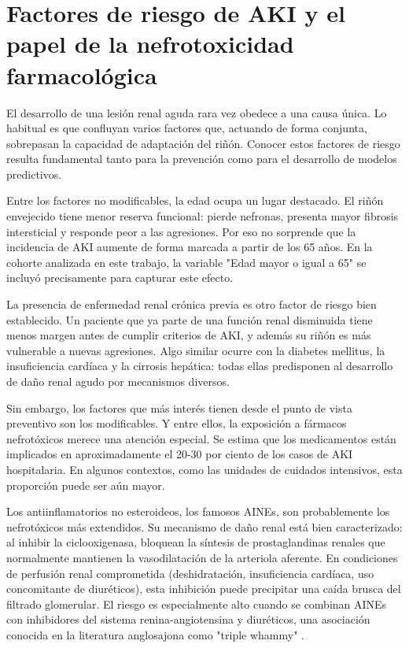 \documentclass[12pt, a4paper, oneside]{report}
\begin{document}
\section{Factores de riesgo de AKI y el papel de la nefrotoxicidad farmacológica}

El desarrollo de una lesión renal aguda rara vez obedece a una causa única. Lo habitual es que confluyan varios factores que, actuando de forma conjunta, sobrepasan la capacidad de adaptación del riñón. Conocer estos factores de riesgo resulta fundamental tanto para la prevención como para el desarrollo de modelos predictivos.

Entre los factores no modificables, la edad ocupa un lugar destacado. El riñón envejecido tiene menor reserva funcional: pierde nefronas, presenta mayor fibrosis intersticial y responde peor a las agresiones. Por eso no sorprende que la incidencia de AKI aumente de forma marcada a partir de los 65 años. En la cohorte analizada en este trabajo, la variable "Edad mayor o igual a 65" se incluyó precisamente para capturar este efecto.

La presencia de enfermedad renal crónica previa es otro factor de riesgo bien establecido. Un paciente que ya parte de una función renal disminuida tiene menos margen antes de cumplir criterios de AKI, y además su riñón es más vulnerable a nuevas agresiones. Algo similar ocurre con la diabetes mellitus, la insuficiencia cardíaca y la cirrosis hepática: todas ellas predisponen al desarrollo de daño renal agudo por mecanismos diversos.

Sin embargo, los factores que más interés tienen desde el punto de vista preventivo son los modificables. Y entre ellos, la exposición a fármacos nefrotóxicos merece una atención especial. Se estima que los medicamentos están implicados en aproximadamente el 20-30 por ciento de los casos de AKI hospitalaria. En algunos contextos, como las unidades de cuidados intensivos, esta proporción puede ser aún mayor.

Los antiinflamatorios no esteroideos, los famosos AINEs, son probablemente los nefrotóxicos más extendidos. Su mecanismo de daño renal está bien caracterizado: al inhibir la ciclooxigenasa, bloquean la síntesis de prostaglandinas renales que normalmente mantienen la vasodilatación de la arteriola aferente. En condiciones de perfusión renal comprometida (deshidratación, insuficiencia cardíaca, uso concomitante de diuréticos), esta inhibición puede precipitar una caída brusca del filtrado glomerular. El riesgo es especialmente alto cuando se combinan AINEs con inhibidores del sistema renina-angiotensina y diuréticos, una asociación conocida en la literatura anglosajona como "triple whammy" \parencite{zhang2017nsaid}.
\end{document}

